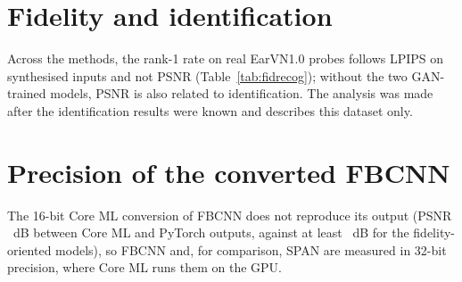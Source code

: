 \section{Fidelity and identification}
\label{app:fidrecog}
Across the \CorrNAll{} methods, the rank-1 rate on real EarVN1.0 probes follows LPIPS on synthesised inputs and not PSNR (Table~\ref{tab:fidrecog}); without the two GAN-trained models, PSNR is also related to identification. The analysis was made after the identification results were known and describes this dataset only.

\begin{table}[H]
\centering
\caption{Spearman correlation between fidelity on synthesised EarVN1.0 inputs (measured degradation, 24-pixel inputs) and the rank-1 rate on real EarVN1.0 probes, across upscaling methods ($p$-values in parentheses). Negative values for LPIPS and DISTS mean that a lower distance goes with a higher rank-1 rate.}
\label{tab:fidrecog}
\end{table}

\section{Precision of the converted FBCNN}
\label{app:coreml}
The 16-bit Core ML conversion of FBCNN does not reproduce its output (PSNR \CoremlPsnrFbHalf{}~dB between Core ML and PyTorch outputs, against at least \CoremlPsnrFidMin{}~dB for the fidelity-oriented models), so FBCNN and, for comparison, SPAN are measured in 32-bit precision, where Core ML runs them on the GPU.
